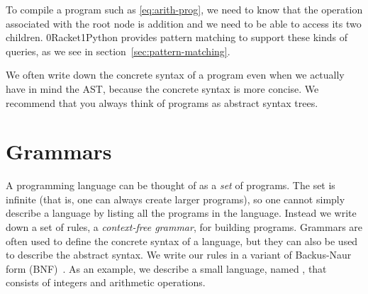 \documentclass[7x10]{TimesAPriori_MIT}%
\def\racketEd{0}
\def\pythonEd{1}
\def\edition{1}
\newcommand{\racket}[1]{{\if\edition\racketEd{#1}\fi}}
\newcommand{\pythonColor}[0]{}
\newcommand{\python}[1]{{\if\edition\pythonEd\pythonColor #1\fi}}
\numberwithin{theorem}{chapter}
\numberwithin{definition}{chapter}
\numberwithin{equation}{chapter}
\begin{document}
To compile a program such as \eqref{eq:arith-prog}, we need to know
that the operation associated with the root node is addition and we
need to be able to access its two
children. \racket{Racket}\python{Python} provides pattern matching to
support these kinds of queries, as we see in
section~\ref{sec:pattern-matching}.

We often write down the concrete syntax of a program even when we
actually have in mind the AST, because the concrete syntax is more
concise.  We recommend that you always think of programs as abstract
syntax trees.

\section{Grammars}
\label{sec:grammar}

A programming language can be thought of as a \emph{set} of programs.
The set is infinite (that is, one can always create larger programs),
so one cannot simply describe a language by listing all the
programs in the language. Instead we write down a set of rules, a
\emph{context-free grammar}, for building programs. Grammars are often used to
define the concrete syntax of a language, but they can also be used to
describe the abstract syntax. We write our rules in a variant of
Backus-Naur form (BNF)~\citep{Backus:1960aa,Knuth:1964aa}.
 As an example,
we describe a small language, named \LangInt{}, that consists of
integers and arithmetic operations.
\end{document}
